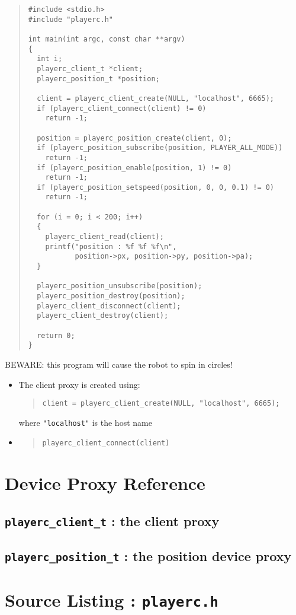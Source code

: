 \documentclass[11pt]{report}
\begin{document}
\begin{quote}
\scriptsize
\begin{verbatim}
#include <stdio.h>
#include "playerc.h"

int main(int argc, const char **argv)
{
  int i;
  playerc_client_t *client;
  playerc_position_t *position;

  client = playerc_client_create(NULL, "localhost", 6665);
  if (playerc_client_connect(client) != 0)
    return -1;

  position = playerc_position_create(client, 0);
  if (playerc_position_subscribe(position, PLAYER_ALL_MODE))
    return -1;
  if (playerc_position_enable(position, 1) != 0)
    return -1;
  if (playerc_position_setspeed(position, 0, 0, 0.1) != 0)
    return -1;
  
  for (i = 0; i < 200; i++)
  {
    playerc_client_read(client);
    printf("position : %f %f %f\n",
           position->px, position->py, position->pa);
  } 

  playerc_position_unsubscribe(position);
  playerc_position_destroy(position);
  playerc_client_disconnect(client);
  playerc_client_destroy(client);

  return 0;
}
\end{verbatim}
\end{quote}
BEWARE: this program will cause the robot to spin in circles!

\begin{itemize}
\item The client proxy is created using:
\begin{quote}\begin{verbatim}
client = playerc_client_create(NULL, "localhost", 6665);
\end{verbatim}\end{quote}
where \verb+"localhost"+ is the host name 

\item 
\begin{quote}\begin{verbatim}
playerc_client_connect(client)
\end{verbatim}\end{quote}

\end{itemize}


\chapter{Device Proxy Reference}

\section{{\tt playerc\_client\_t} : the client proxy}




\section{{\tt playerc\_position\_t} : the position device proxy}




\appendix

\chapter{Source Listing : \tt playerc.h}
\end{document}
